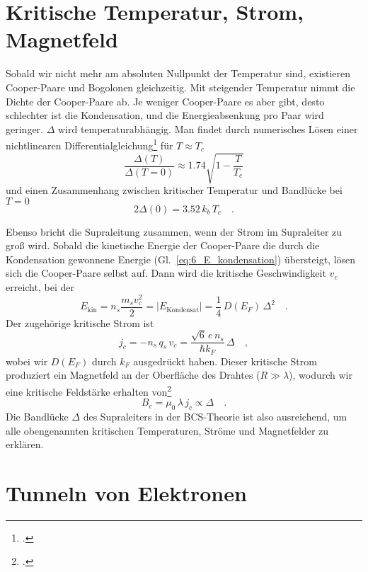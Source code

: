 \section*{Kritische Temperatur, Strom, Magnetfeld}

Sobald wir nicht mehr am absoluten Nullpunkt der Temperatur sind, existieren Cooper-Paare und Bogolonen gleichzeitig. Mit steigender Temperatur nimmt die Dichte der Cooper-Paare ab. Je weniger Cooper-Paare es aber gibt, desto schlechter ist die Kondensation, und die Energieabsenkung pro Paar wird geringer. $\Delta$ wird temperaturabhängig. Man findet durch numerisches Lösen einer nichtlinearen Differentialgleichung\footcite{Gross_FK} für $T \approx T_c$
\begin{equation}
    \frac{\Delta(T)}{\Delta(T=0)} \approx 1.74 \sqrt{1 - \frac{T}{T_c}}
\end{equation}
und einen Zusammenhang zwischen kritischer Temperatur und Bandlücke bei $T=0$
\begin{equation}
    2 \Delta(0) = 3.52  \, k_b  \, T_c \quad .
\end{equation}

Ebenso bricht die Supraleitung zusammen, wenn der Strom im Supraleiter zu groß wird. Sobald die kinetische Energie der Cooper-Paare die durch die Kondensation gewonnene Energie (Gl.~\ref{eq:6_E_kondensation}) übersteigt, lösen sich die Cooper-Paare selbst auf. Dann wird die kritische Geschwindigkeit $v_c$ erreicht, bei der 
\begin{equation}
    E_\text{kin} = n_s \frac{m_s v_c^2}{2} =  | E_\text{Kondensat} |  = \frac{1}{4} \, D(E_F) \, \Delta^2 \quad .
\end{equation}
Der zugehörige kritische Strom ist %
\begin{equation}
    j_c = - n_s \, q_s \,  v_c = \frac{\sqrt{6 } \,  e \, n_s}{\hbar k_F} \, \Delta \quad ,
\end{equation}
wobei wir $D(E_F)$ durch $k_F$ ausgedrückt haben. Dieser kritische Strom produziert ein Magnetfeld an der Oberfläche des Drahtes ($R \gg \lambda$), wodurch wir eine kritische Feldstärke erhalten von\footcite{Hunklinger2014}
\begin{equation}
 B_c = \mu_0 \, \lambda \, j_c  \propto \Delta \quad .
\end{equation}
Die Bandlücke $\Delta$ des Supraleiters in der BCS-Theorie ist also ausreichend, um alle obengenannten kritischen Temperaturen, Ströme und Magnetfelder zu erklären.

\section{Tunneln von Elektronen}

